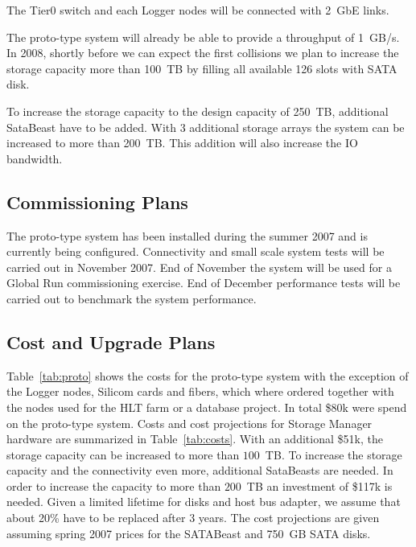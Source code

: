 The Tier0 switch and each Logger nodes will be connected with 2~GbE links.  

The proto-type system will already be able to provide a throughput of 1~GB/s. In 2008, shortly before we can expect the first collisions we plan to increase the storage capacity more than 100~TB by filling all available 126 slots with SATA disk.

To increase the storage capacity to the design capacity of 250~TB, additional SataBeast have to be added. With 3 additional storage arrays the system can be increased to more than 200~TB. This addition will also increase the IO bandwidth. 

\subsection{Commissioning Plans}
The proto-type system has been installed during the summer 2007 and is currently being configured. Connectivity and small scale system tests will be carried out in November 2007. End of November the system will be used for a Global Run commissioning exercise. End of December performance tests will be carried out to benchmark the system performance. 

\subsection{Cost and Upgrade Plans}
Table~\ref{tab:proto} shows the costs for the proto-type system with the exception of the Logger nodes, Silicom cards and fibers, which where ordered together with the nodes used for the HLT farm or a database project. In total \$80k were spend on the proto-type system. Costs and cost projections for Storage Manager hardware are summarized in Table~\ref{tab:costs}. With an additional \$51k, the storage capacity can be increased to more than $100$~TB. To increase the storage capacity and the connectivity even more, additional SataBeasts are needed. In order to increase the capacity to more than $200$~TB an investment of \$117k is needed. Given a limited lifetime for disks and host bus adapter, we assume that about 20\% have to be replaced after 3 years. 
The cost projections are given assuming spring 2007 prices for the SATABeast and 750~GB SATA disks. 

